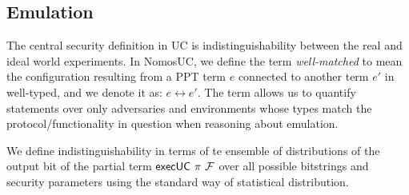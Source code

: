 \subsection{Emulation}
The central security definition in UC is indistinguishability between the real and ideal world experiments.
In NomosUC, we define the term \textit{well-matched} to mean the configuration resulting from a PPT term $e$ connected to another term $e'$ in well-typed, and we denote it as: $e \leftrightarrow e'$.
The term allows us to quantify statements over only adversaries and environments whose types match the protocol/functionality in question when reasoning about emulation. 

We define indistinguishability in terms of te ensemble of distributions of the output bit of the partial term $\mathsf{execUC}\ \pi\ \mathcal{F}$ over all possible bitstrings and security parameters using the standard way of statistical distribution.  


